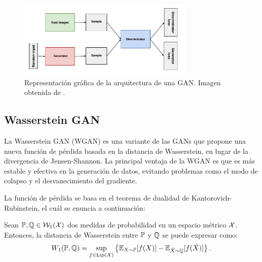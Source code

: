 \begin{figure}[H]
	\centering
	\includegraphics[width=0.75\textwidth]{img/gan/gan_diagram.pdf}
	\caption{Representación gráfica de la arquitectura de una GAN. Imagen obtenida de \cite{googlegan}.}
	\label{fig:gan-diagram}
\end{figure}






\subsection{Wasserstein GAN}\label{ssec:wasserstein-gan}  %

La Wasserstein GAN (WGAN) \cite{arjovsky2017wasserstein} es una variante de las GANs que propone una nueva función de pérdida basada en la distancia de Wasserstein, en lugar de la divergencia de Jensen-Shannon. La principal ventaja de la WGAN es que es más estable y efectiva en la generación de datos, evitando problemas como el modo de colapso y el desvanecimiento del gradiente.

La función de pérdida se basa en el teorema de dualidad de Kantorovich-Rubinstein, el cuál se enuncia a continuación:
\begin{theorem}\label{thm:dualidad-kantorovich-rubinstein}
	Sean $\Prob, \ProbQ \in \WassersteinSpace[1]{\cX}$ dos medidas de probabilidad en un espacio métrico $\mathcal{X}$. Entonces, la distancia de Wasserstein entre $\Prob$ y $\ProbQ$ se puede expresar como:
	\begin{equation}\label{eq:dualidad-kantorovich-rubinstein}
		\Wasserstein[1]{\Prob}{\ProbQ} = \sup_{f \in \Lip[\cX]} \left\{ \Exp_{X\sim \Prob} [f(X)] - \Exp_{\tilde X \sim \ProbQ} [f(\tilde X)] \right\}.
	\end{equation}
\end{theorem}


